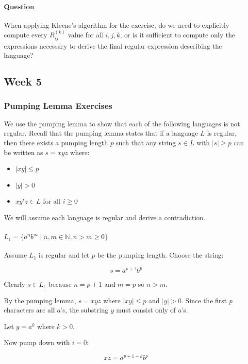 \documentclass[11pt, a4paper]{article}
\theoremstyle{definition}
\theoremstyle{remark}
\begin{document}
\paragraph{Question}
When applying Kleene's algorithm for the exercise, do we need to explicitly compute every $R_{ij}^{(k)}$ value for all $i,j,k$, or is it sufficient to compute only the expressions necessary to derive the final regular expression describing the language?

\subsection{Week 5}

\subsubsection*{Pumping Lemma Exercises}

We use the pumping lemma to show that each of the following languages is not regular. Recall that the pumping lemma states that if a language $L$ is regular, then there exists a pumping length $p$ such that any string $s \in L$ with $|s| \ge p$ can be written as $s = xyz$ where:

\begin{itemize}
\item $|xy| \le p$
\item $|y| > 0$
\item $xy^iz \in L$ for all $i \ge 0$
\end{itemize}

We will assume each language is regular and derive a contradiction.

\paragraph{$L_1 = \{a^n b^m \mid n,m \in \mathbb{N}, n > m \ge 0\}$}

Assume $L_1$ is regular and let $p$ be the pumping length.  
Choose the string:

\[
s = a^{p+1}b^p
\]

Clearly $s \in L_1$ because $n=p+1$ and $m=p$ so $n>m$.

By the pumping lemma, $s = xyz$ where $|xy| \le p$ and $|y|>0$. Since the first $p$ characters are all $a$'s, the substring $y$ must consist only of $a$'s.

Let $y = a^k$ where $k>0$.

Now pump down with $i=0$:

\[
xz = a^{p+1-k}b^p
\]
\end{document}
